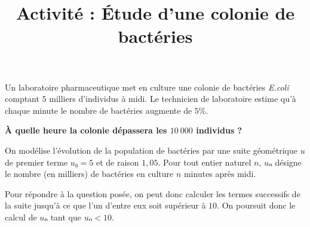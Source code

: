 \documentclass[
	classe=$1^{ere}STI2D$
]{informatique}
\title{Activité : Étude d'une colonie de bactéries}
\begin{document}
\maketitle

Un laboratoire pharmaceutique met en culture une colonie de bactéries \textit{E.coli} comptant $5$ milliers d'individus à midi. Le technicien de laboratoire estime qu'à chaque minute le nombre de bactéries augmente de $5$\%.

\begin{tcolorbox}
	\textbf{À quelle heure la colonie dépassera les $10\ 000$ individus ?} \bigskip

	On modélise l'évolution de la population de bactéries par une suite géométrique $u$ de premier terme $u₀ = 5$ et de raison $1,05$. Pour tout entier naturel $n$, $uₙ$ désigne le nombre (en milliers) de bactéries en culture $n$ minutes après midi.

	Pour répondre à la question posée, on peut donc calculer les termes successifs de la suite jusqu'à ce que l'un d'entre eux soit supérieur à $10$. On poursuit donc le calcul de $uₙ$ tant que $uₙ < 10$.
\end{tcolorbox}
\end{document}
